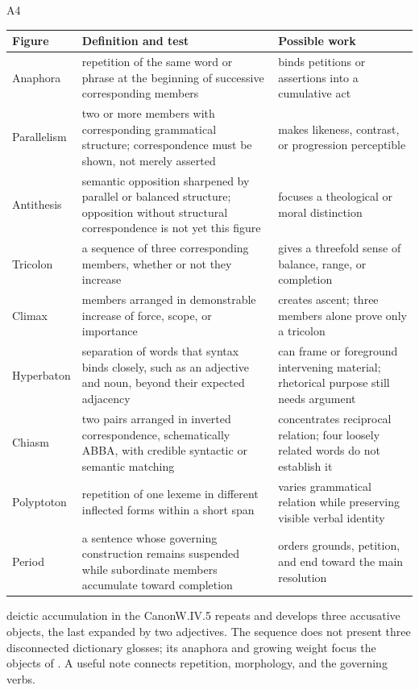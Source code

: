 \begin{courseunit}{A4}
\begin{xltabular}{\linewidth}{@{}P{1.1in}P{2.25in}Y@{}}
  \toprule
  \textbf{Figure} & \textbf{Definition and test} & \textbf{Possible work} \\
  \midrule\endhead
  Anaphora & repetition of the same word or phrase at the beginning of
       successive corresponding members & binds petitions or assertions into a
       cumulative act \\
  Parallelism & two or more members with corresponding grammatical structure;
       correspondence must be shown, not merely asserted & makes likeness,
       contrast, or progression perceptible \\
  Antithesis & semantic opposition sharpened by parallel or balanced structure;
       opposition without structural correspondence is not yet this figure &
       focuses a theological or moral distinction \\
  Tricolon & a sequence of three corresponding members, whether or not they
       increase & gives a threefold sense of balance, range, or completion \\
  Climax & members arranged in demonstrable increase of force, scope, or
       importance & creates ascent; three members alone prove only a tricolon \\
  Hyperbaton & separation of words that syntax binds closely, such as an
       adjective and noun, beyond their expected adjacency & can frame or
       foreground intervening material; rhetorical purpose still needs argument \\
  Chiasm & two pairs arranged in inverted correspondence, schematically ABBA,
       with credible syntactic or semantic matching & concentrates reciprocal
       relation; four loosely related words do not establish it \\
  Polyptoton & repetition of one lexeme in different inflected forms within a
       short span & varies grammatical relation while preserving visible verbal
       identity \\
  Period & a sentence whose governing construction remains suspended while
       subordinate members accumulate toward completion & orders grounds,
       petition, and end toward the main resolution \\
  \bottomrule
\end{xltabular}

\begin{workedexample}{deictic accumulation in the Canon}{W.IV.5}
 repeats
 and develops three accusative objects, the last expanded by two
adjectives. The sequence does not present three disconnected dictionary
glosses; its anaphora and growing weight focus the objects of
. A useful note connects repetition, morphology, and
the governing verbs.
\end{workedexample}


\end{courseunit}
